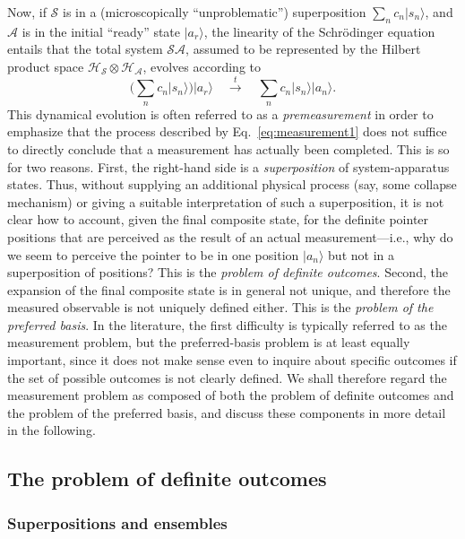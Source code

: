 \documentclass[rmp,aps,amsmath,amsfonts,noshowkeys,noshowpacs,12pt]{revtex4}
\newcommand{\ket}[1]{\ensuremath{|{#1\rangle}}}
\begin{document}
Now, if $\mathcal{S}$ is in a (microscopically ``unproblematic'')
superposition $\sum_n c_n \ket{s_n}$, and $\mathcal{A}$ is in the
initial ``ready'' state $\ket{a_r}$, the linearity of the
Schr\"odinger equation entails that the total system $\mathcal{SA}$,
assumed to be represented by the Hilbert product space
$\mathcal{H}_{\mathcal{S}} \otimes \mathcal{H}_{\mathcal{A}}$, evolves
according to
%
\begin{equation}
\label{eq:measurement1} \bigg( \sum_n c_n \ket{s_n}
\bigg) \ket{a_r} \quad \stackrel{t}{\longrightarrow} \quad
\sum_n c_n \ket{s_n} \ket{a_n}.  
\end{equation}
%
This dynamical evolution is often referred to as a
\emph{premeasurement} in order to emphasize that the process described
by Eq.~\eqref{eq:measurement1} does not suffice to directly conclude
that a measurement has actually been completed.  This is so for two
reasons.  First, the right-hand side is a \emph{superposition} of
system-apparatus states.  Thus, without supplying an additional
physical process (say, some collapse mechanism) or giving a suitable
interpretation of such a superposition, it is not clear how to
account, given the final composite state, for the definite pointer
positions that are perceived as the result of an actual
measurement---i.e., why do we seem to perceive the pointer to be in
one position $\ket{a_n}$ but not in a superposition of positions? This
is the {\em problem of definite outcomes}.  Second, the expansion of
the final composite state is in general not unique, and therefore the
measured observable is not uniquely defined either. This is the
\emph{problem of the preferred basis}. In the literature, the first
difficulty is typically referred to as the measurement problem, but
the preferred-basis problem is at least equally important, since it
does not make sense even to inquire about specific outcomes if the set
of possible outcomes is not clearly defined. We shall therefore regard
the measurement problem as composed of both the problem of definite
outcomes and the problem of the preferred basis, and discuss these
components in more detail in the following.


\subsection{\label{sec:defoutcomes}The problem of definite outcomes}

\subsubsection{Superpositions and ensembles}
\end{document}
